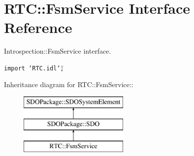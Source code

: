 \section{RTC::Fsm\-Service Interface Reference}
\label{interfaceRTC_1_1FsmService}
Introspection::Fsm\-Service interface.  


{\tt import \char`\"{}RTC.idl\char`\"{};}

Inheritance diagram for RTC::Fsm\-Service::\begin{figure}[H]
\begin{center}
\leavevmode
\includegraphics[height=3cm]{interfaceRTC_1_1FsmService}
\end{center}
\end{figure}
